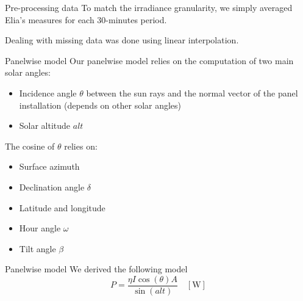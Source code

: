 \documentclass[12pt]{beamer}
\begin{document}
\begin{frame}{Pre-processing data}
    To match the irradiance granularity, we simply \alert{averaged} Elia's measures for each 30-minutes period.
    
    Dealing with missing data was done using \alert{linear interpolation}.
\end{frame}

\begin{frame}{Panelwise model}
    Our panelwise model relies on the computation of two main \alert{solar angles}:
    \begin{itemize}
        \item Incidence angle $\theta$ between the sun rays and the normal vector of the panel installation (depends on other solar angles)
        \item Solar altitude $alt$
    \end{itemize}
    The cosine of $\theta$ relies on:
    \begin{itemize}
        \item Surface azimuth
        \item Declination angle $\delta$
        \item Latitude and longitude
        \item Hour angle $\omega$
        \item Tilt angle $\beta$
    \end{itemize}
\end{frame}

\begin{frame}{Panelwise model}
    We derived the following model
    \begin{equation*}
        P = \frac{\eta I \cos(\theta) A}{\sin(alt)} \quad [\si{\watt}]
    \end{equation*}
\end{frame}
\end{document}
